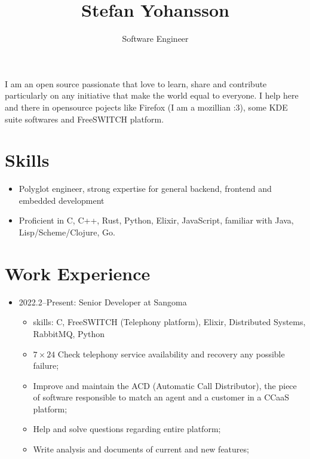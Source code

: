 \documentclass[
]{article}
\title{Stefan Yohansson}
\subtitle{Software Engineer}
\author{}
\date{}
\providecommand{\tightlist}{%
  \setlength{\itemsep}{0pt}\setlength{\parskip}{0pt}}
\begin{document}
\maketitle

I am an open source passionate that love to learn, share and contribute
particularly on any initiative that make the world equal to everyone. I
help here and there in opensource pojects like Firefox (I am a mozillian
:3), some KDE suite softwares and FreeSWITCH platform.

\hypertarget{skills}{%
\section{Skills}\label{skills}}

\begin{itemize}
\tightlist
\item
  Polyglot engineer, strong expertise for general backend, frontend and
  embedded development
\item
  Proficient in C, C++, Rust, Python, Elixir, JavaScript, familiar with
  Java, Lisp/Scheme/Clojure, Go.
\end{itemize}

\hypertarget{work-experience}{%
\section{Work Experience}\label{work-experience}}

\begin{itemize}
\tightlist
\item
  2022.2--Present: Senior Developer at Sangoma

  \begin{itemize}
  \tightlist
  \item
    skills: C, FreeSWITCH (Telephony platform), Elixir, Distributed
    Systems, RabbitMQ, Python
  \item
    \(7 \times 24\) Check telephony service availability and recovery
    any possible failure;
  \item
    Improve and maintain the ACD (Automatic Call Distributor), the piece
    of software responsible to match an agent and a customer in a CCaaS
    platform;
  \item
    Help and solve questions regarding entire platform;
  \item
    Write analysis and documents of current and new features;
  \end{itemize}
\end{itemize}
\end{document}
